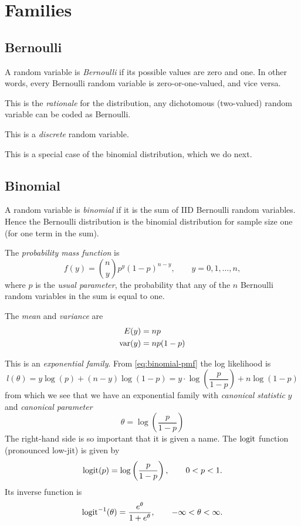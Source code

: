 
\chapter{Families} \label{app:families}

\section{Bernoulli}
\label{sec:bernoulli}

A random variable is \emph{Bernoulli} if its possible values are zero and one.
In other words, every Bernoulli random variable is zero-or-one-valued,
and vice versa.

This is the \emph{rationale} for the distribution, any dichotomous (two-valued)
random variable can be coded as Bernoulli.

This is a \emph{discrete} random variable.

This is a special case of the binomial distribution, which we do next.

\section{Binomial}
\label{sec:binomial}

A random variable is \emph{binomial} if it is the sum of IID Bernoulli
random variables.  Hence the Bernoulli distribution is the binomial
distribution for sample size one (for one term in the sum).

The \emph{probability mass function} is
\begin{equation} \label{eq:binomial-pmf}
   f(y) = \binom{n}{y} p^y (1 - p)^{n - y}, \qquad y = 0, 1, \ldots, n,
\end{equation}
where $p$ is the \emph{usual parameter}, the probability that any of the
$n$ Bernoulli random variables in the sum is equal to one.

The \emph{mean} and \emph{variance} are
\begin{align*}
   E(y) & = n p
   \\
   \operatorname{var}(y) & = n p (1 - p)
\end{align*}

This is an \emph{exponential family}.  From \eqref{eq:binomial-pmf}
the log likelihood is
$$
   l(\theta) = y \log(p) + (n - y) \log(1 - p)
   = y \cdot \log\left(\frac{p}{1 - p}\right) + n \log(1 - p)
$$
from which we see that we have an exponential family with
\emph{canonical statistic} $y$ and \emph{canonical parameter}
$$
   \theta = \log\left(\frac{p}{1 - p}\right)
$$
The right-hand side is so important that it is given a name.  The
$\operatorname{logit}$ function (pronounced low-jit) is given by
$$
   \operatorname{logit}(p) = \log\left(\frac{p}{1 - p}\right), \qquad 0 < p < 1.
$$
Its inverse function is
$$
   \operatorname{logit}^{-1}(\theta) = \frac{e^\theta}{1 + e^\theta},
   \qquad - \infty < \theta < \infty.
$$

